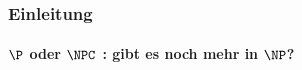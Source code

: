 \begin{frame}
	\frametitle{Einleitung}
	\framesubtitle{$\P$ oder $\NPC$ : gibt es noch mehr in $\NP$?}
\end{frame}

